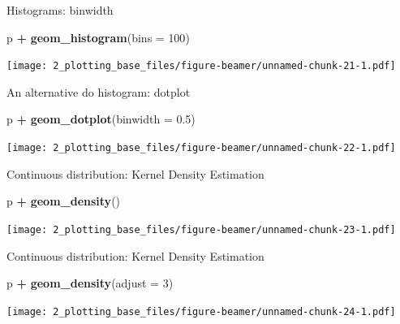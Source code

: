 \documentclass[
  ignorenonframetext,
]{beamer}
\newenvironment{Shaded}{\begin{snugshade}}{\end{snugshade}}
\newcommand{\DataTypeTok}[1]{\textcolor[rgb]{0.13,0.29,0.53}{#1}}
\newcommand{\DecValTok}[1]{\textcolor[rgb]{0.00,0.00,0.81}{#1}}
\newcommand{\FloatTok}[1]{\textcolor[rgb]{0.00,0.00,0.81}{#1}}
\newcommand{\KeywordTok}[1]{\textcolor[rgb]{0.13,0.29,0.53}{\textbf{#1}}}
\newcommand{\NormalTok}[1]{#1}
\newcommand{\OperatorTok}[1]{\textcolor[rgb]{0.81,0.36,0.00}{\textbf{#1}}}
\newcommand{\StringTok}[1]{\textcolor[rgb]{0.31,0.60,0.02}{#1}}
\begin{document}
\begin{frame}[fragile]{Histograms: binwidth}
\protect\hypertarget{histograms-binwidth-1}{}

\begin{Shaded}
\begin{Highlighting}[]
\NormalTok{p }\OperatorTok{+}\StringTok{ }\KeywordTok{geom_histogram}\NormalTok{(}\DataTypeTok{bins =} \DecValTok{100}\NormalTok{)}
\end{Highlighting}
\end{Shaded}

\texttt{[image: 2\_plotting\_base\_files/figure-beamer/unnamed-chunk-21-1.pdf]}

\end{frame}

\begin{frame}[fragile]{An alternative do histogram: dotplot}
\protect\hypertarget{an-alternative-do-histogram-dotplot}{}

\begin{Shaded}
\begin{Highlighting}[]
\NormalTok{p }\OperatorTok{+}\StringTok{ }\KeywordTok{geom_dotplot}\NormalTok{(}\DataTypeTok{binwidth =} \FloatTok{0.5}\NormalTok{)}
\end{Highlighting}
\end{Shaded}

\texttt{[image: 2\_plotting\_base\_files/figure-beamer/unnamed-chunk-22-1.pdf]}

\end{frame}

\begin{frame}[fragile]{Continuous distribution: Kernel Density
Estimation}
\protect\hypertarget{continuous-distribution-kernel-density-estimation}{}

\begin{Shaded}
\begin{Highlighting}[]
\NormalTok{p }\OperatorTok{+}\StringTok{ }\KeywordTok{geom_density}\NormalTok{()}
\end{Highlighting}
\end{Shaded}

\texttt{[image: 2\_plotting\_base\_files/figure-beamer/unnamed-chunk-23-1.pdf]}

\end{frame}

\begin{frame}[fragile]{Continuous distribution: Kernel Density
Estimation}
\protect\hypertarget{continuous-distribution-kernel-density-estimation-1}{}

\begin{Shaded}
\begin{Highlighting}[]
\NormalTok{p }\OperatorTok{+}\StringTok{ }\KeywordTok{geom_density}\NormalTok{(}\DataTypeTok{adjust =} \DecValTok{3}\NormalTok{)}
\end{Highlighting}
\end{Shaded}

\texttt{[image: 2\_plotting\_base\_files/figure-beamer/unnamed-chunk-24-1.pdf]}

\end{frame}
\end{document}
